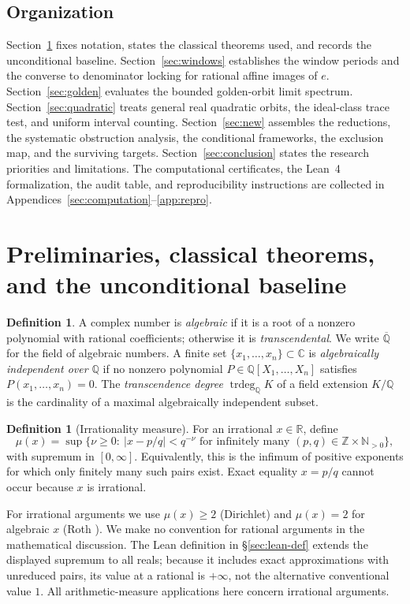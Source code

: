 \documentclass[11pt]{amsart}
\theoremstyle{definition}
\newtheorem{definition}[theorem]{Definition}
\theoremstyle{remark}
\numberwithin{equation}{section}
\newcommand{\Q}{\mathbb{Q}}
\newcommand{\R}{\mathbb{R}}
\newcommand{\C}{\mathbb{C}}
\newcommand{\Z}{\mathbb{Z}}
\newcommand{\N}{\mathbb{N}}
\newcommand{\Qbar}{\overline{\mathbb{Q}}}
\newcommand{\trdeg}{\operatorname{trdeg}}
\newcommand{\irr}{\mu}
\begin{document}
\subsection{Organization} Section~\ref{sec:prelim} fixes notation, states the classical theorems used, and records the unconditional baseline. Section~\ref{sec:windows} establishes the window periods and the converse to denominator locking for rational affine images of $e$. Section~\ref{sec:golden} evaluates the bounded golden-orbit limit spectrum. Section~\ref{sec:quadratic} treats general real quadratic orbits, the ideal-class trace test, and uniform interval counting. Section~\ref{sec:new} assembles the reductions, the systematic obstruction analysis, the conditional frameworks, the exclusion map, and the surviving targets. Section~\ref{sec:conclusion} states the research priorities and limitations. The computational certificates, the Lean~4 formalization, the audit table, and reproducibility instructions are collected in Appendices~\ref{sec:computation}--\ref{app:repro}.

\section{Preliminaries, classical theorems, and the unconditional baseline}\label{sec:prelim}

\begin{definition}
A complex number is \emph{algebraic} if it is a root of a nonzero polynomial with rational coefficients; otherwise it is \emph{transcendental}. We write $\Qbar$ for the field of algebraic numbers. A finite set $\{x_1,\dots,x_n\}\subset\C$ is \emph{algebraically independent over $\Q$} if no nonzero polynomial $P\in\Q[X_1,\dots,X_n]$ satisfies $P(x_1,\dots,x_n)=0$. The \emph{transcendence degree} $\trdeg_\Q K$ of a field extension $K/\Q$ is the cardinality of a maximal algebraically independent subset.
\end{definition}

\begin{definition}[Irrationality measure]\label{def:measure}
For an irrational $x\in\R$, define
\[
\irr(x)=\sup\{\nu\ge0:\ |x-p/q|<q^{-\nu}
\text{ for infinitely many }(p,q)\in\Z\times\N_{>0}\},
\]
with supremum in $[0,\infty]$. Equivalently, this is the infimum of positive exponents for which only finitely many such pairs exist. Exact equality $x=p/q$ cannot occur because $x$ is irrational.
\end{definition}

For irrational arguments we use $\irr(x)\ge2$ (Dirichlet) and $\irr(x)=2$ for algebraic $x$ (Roth \cite{Roth1955}). We make no convention for rational arguments in the mathematical discussion. The Lean definition in \S\ref{sec:lean-def} extends the displayed supremum to all reals; because it includes exact approximations with unreduced pairs, its value at a rational is $+\infty$, not the alternative conventional value $1$. All arithmetic-measure applications here concern irrational arguments.
\end{document}
